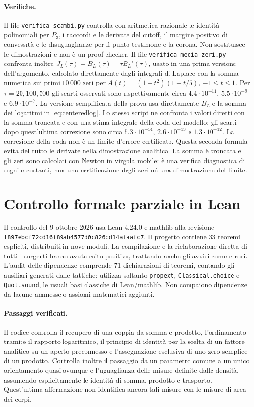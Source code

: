 \documentclass[11pt,a4paper]{article}
\theoremstyle{remark}
\begin{document}
\paragraph{Verifiche.}
Il file \texttt{verifica\_scambi.py} controlla con aritmetica razionale le
identità polinomiali per $P_3$, i raccordi e le derivate del cutoff, il
margine positivo di convessità e le disuguaglianze per il punto testimone
e la corona. Non sostituisce le dimostrazioni e non è un proof checker.
Il file \texttt{verifica\_media\_zeri.py} confronta inoltre
$J_L(\tau)=B_L(\tau)-\tau B_L'(\tau)$, usato in una prima versione
dell'argomento, calcolato direttamente dagli integrali di Laplace con la
somma numerica sui primi $10\,000$ zeri per
$A(t)=(1-t^2)(1+t/5)$, $-1\leq t\leq1$.
Per $\tau=20,100,500$ gli scarti osservati sono rispettivamente circa
$4.4\cdot10^{-11}$, $5.5\cdot10^{-9}$ e $6.9\cdot10^{-7}$.
La versione semplificata della prova usa direttamente $B_L$ e la
somma dei logaritmi in \eqref{eq:centeredlog}. Lo stesso script ne
confronta i valori diretti con la somma troncata e con una stima
integrale della coda del modello; gli scarti dopo quest'ultima
correzione sono circa $5.3\cdot10^{-14}$, $2.6\cdot10^{-13}$ e
$1.3\cdot10^{-12}$. La correzione della coda non è un limite
d'errore certificato. Questa seconda formula evita del tutto le
derivate nella dimostrazione analitica.
La somma è troncata e gli zeri sono calcolati con Newton in virgola
mobile: è una verifica diagnostica di segni e costanti, non una
certificazione degli zeri né una dimostrazione del limite.

\section{Controllo formale parziale in Lean}\label{sec:leancheck}
Il controllo del 9 ottobre 2026 usa Lean 4.24.0 e mathlib alla
revisione \texttt{f897ebcf72cd16f89ab4577d0c826cd14afaafc7}.
Il progetto contiene 33 teoremi espliciti, distribuiti in nove moduli.
La compilazione e la rielaborazione diretta di tutti i sorgenti hanno
avuto esito positivo, trattando anche gli avvisi come errori.
L'audit delle dipendenze comprende 71 dichiarazioni di teoremi,
contando gli ausiliari generati dalle tattiche: utilizza soltanto
\texttt{propext}, \texttt{Classical.choice} e \texttt{Quot.sound},
le usuali basi classiche di Lean/mathlib. Non compaiono dipendenze
da lacune ammesse o assiomi matematici aggiunti.

\paragraph{Passaggi verificati.}
Il codice controlla il recupero di una coppia da somma e prodotto,
l'ordinamento tramite il rapporto logaritmico, il principio di
identità per la scelta di un fattore analitico su un aperto
preconnesso e l'assegnazione esclusiva di uno zero semplice di un
prodotto. Controlla inoltre il passaggio da un parametro comune
a un unico orientamento quasi ovunque e l'uguaglianza delle
misure definite dalle densità, assumendo esplicitamente le
identità di somma, prodotto e trasporto. Quest'ultima affermazione
non identifica ancora tali misure con le misure di area dei corpi.
\end{document}
